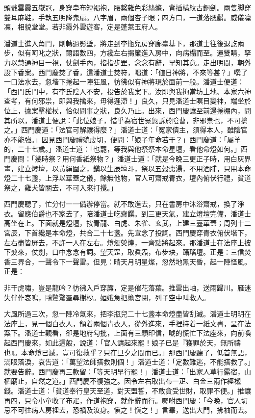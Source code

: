 \begin{myquote}
頭戴雲霞五嶽冠，身穿皁布短褐袍，腰繫雜色彩絲縧，背插橫紋古銅劍。兩隻脚穿雙耳麻鞋，手執五明降鬼扇。八字眉，兩個杏子眼；四方口，一道落腮鬍。威儀凜凜，相貌堂堂。若非霞外雲遊客，定是蓬萊玉府人。
\end{myquote}

潘道士進入角門，剛轉過影壁，將走到李瓶兒房穿廊臺基下，那道士往後退訖兩步，似有呵叱之狀，爾語數四，方纔左右揭簾進入房中，向病榻而至。運雙睛，拏力以慧通神目一視，仗劍手內，掐指步罡，念念有辭，早知其意。{}走出明間，朝外設下香案。西門慶焚了香，這潘道士焚符，喝道：「値日神將，不來等甚？」噀了一口法水去，忽堦下捲起一陣狂風，彷彿似有神將現於面前一般。潘道士便道：「西門氏門中，有李氏陰人不安，投告於我案下。汝即與我拘當坊土地、本家六神查考，有何邪祟，即與我擒來，毋得遲滯！」良久，只見潘道士瞑目變神，端坐於位上，據案擊權杖，恰似問事之狀，{}良久乃止。出來，西門慶讓至前邊捲棚內，問其所以，潘道士便說：「此位娘子，惜乎為宿世冤愆訴於陰曹，非邪祟也，不可擒之。」西門慶道：「法官可解禳得麼？」潘道士道：「冤家債主，須得本人，雖陰官亦不能強。」{}因見西門慶禮貌虔切，便問：「娘子年命若干？」西門慶道：「屬羊的，二十七歲。」潘道士道：「也罷，等我與他祭祭本命星壇，看他命燈如何。」西門慶問：「幾時祭？用何香紙祭物？」潘道士道：「就是今晚三更正子時，用白灰界畫，建立燈壇，以黃絹圍之，鎭以生辰壇斗，祭以五穀棗湯，不用酒脯，只用本命燈二十七盞，上浮以華蓋之儀，餘無他物，官人可齋戒青衣，壇內俯伏行禮，貧道祭之，雞犬皆關去，不可入來打攪。」

西門慶聽了，忙分付一一備辦停當。就不敢進去，只在書房中沐浴齋戒，換了淨衣。留應伯爵也不家去了，陪潘道士吃齋饌。到三更天氣，建立燈壇完備，潘道士高坐在上。下面就是燈壇，按青龍、白虎、朱雀、玄武，上建三臺華蓋；周列十二宮辰，下首纔是本命燈，共合二十七盞。先宣念了投詞。西門慶穿青衣俯伏堦下，左右盡皆屏去，不許一人在左右。燈燭熒煌，一齊點將起來。那潘道士在法座上披下髮來，仗劍，口中念念有詞。望天罡，取眞炁，布步玦，躡瑤壇。正是：三信焚香三界合，一聲令下一聲雷。但見：晴天月明星燦，忽然地黑天昏，起一陣怪風。正是：

\begin{myquote}
非干虎嘯，豈是龍吟？彷彿入戶穿簾，定是催花落葉。推雲出岫，送雨歸川。雁迷失伴作哀鳴，鷗鷺驚羣尋樹杪。姮娥急把蟾宮閉，列子空中叫救人。
\end{myquote}

大風所過三次，忽一陣冷氣來，把李瓶兒二十七盞本命燈盡皆刮滅。潘道士明明在法座上，見一個白衣人，領着兩個青衣人，從外進來，手裡持着一紙文書，呈在法案下。潘道士觀看，卻是地府勾批，上面有三顆印信，唬的慌忙下法座來，向前喚起西門慶來，如此這般，說道：「官人請起來罷！娘子已是『獲罪於天，無所禱也』。本命燈已滅，豈可復救乎？只在旦夕之間而已。」那西門慶聽了，低首無語，滿眼落淚，哀告道：「萬望法師搭救則個！」{}潘道士道：「定數難逃，不能搭救了。」就要告辭。西門慶再三款留：「等天明早行罷！」潘道士道：「出家人草行露宿，山栖廟止，自然之道。」西門慶不復強之。因令左右取出布一疋、白金三兩作經襯錢。潘道士道：「貧道奉行皇天至道，對天盟誓，不敢貪受世財，取罪不便。」推讓再四，只令小童收了布疋，作道袍穿，就作辭而行。囑咐西門慶：「今晚，官人切忌不可往病人房裡去，恐禍及汝身。愼之！愼之！」言畢，送出大門，拂袖而去。

